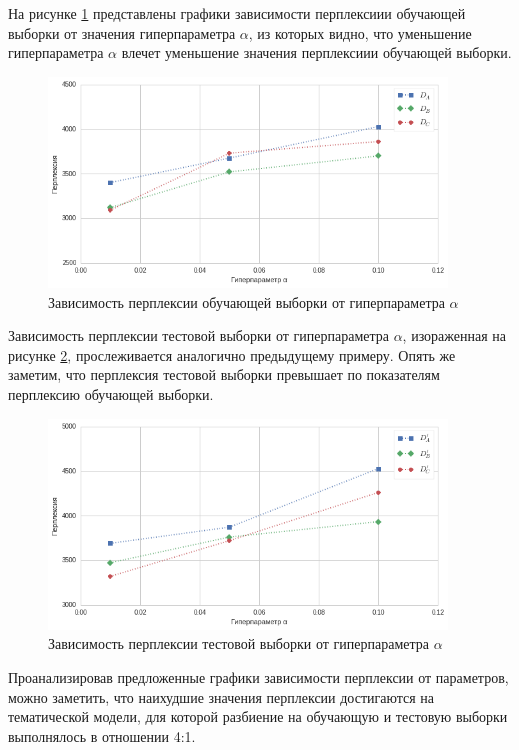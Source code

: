 \documentclass[a4paper]{report}
\begin{document}
	 На рисунке \ref{fig:PerpAlphaOnTrain} представлены графики зависимости перплексиии обучающей выборки от значения гиперпараметра $\alpha$, из которых видно, что уменьшение гиперпараметра $\alpha$ влечет уменьшение значения перплексиии обучающей выборки.
	 
	 \begin{figure}[h]
		\centering
		\includegraphics[width=400px]
		{imgs/PerplexityAlphaOnTrain.png}
		\caption{Зависимость перплексии обучающей выборки от гиперпараметра $\alpha$ }
		\label{fig:PerpAlphaOnTrain}
	\end{figure}
	 
	 Зависимость перплексии тестовой выборки от гиперпараметра $\alpha$, изораженная на рисунке \ref{fig:PerpAlphaOnTest}, прослеживается аналогично предыдущему примеру. Опять же заметим, что перплексия тестовой выборки превышает по показателям перплексию обучающей выборки. 
	 
	 \begin{figure}[h]
		\centering
		\includegraphics[width=400px]
		{imgs/PerplexityAlphaOnTest.png}
		\caption{Зависимость перплексии тестовой выборки от гиперпараметра $\alpha$ }
		\label{fig:PerpAlphaOnTest}
	\end{figure}
	 
	Проанализировав предложенные графики зависимости перплексии от параметров, можно заметить, что наихудшие значения перплексии достигаются на тематической модели, для которой разбиение на обучающую и тестовую выборки выполнялось в отношении 4:1. 
	 
\end{document}
